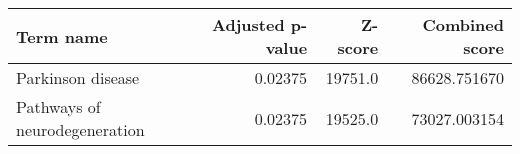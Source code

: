 \begin{tabular}{lrrr}
\toprule
                    Term name &  Adjusted p-value &  Z-score &  Combined score \\
\midrule
            Parkinson disease &           0.02375 &  19751.0 &    86628.751670 \\
Pathways of neurodegeneration &           0.02375 &  19525.0 &    73027.003154 \\
\bottomrule
\end{tabular}
